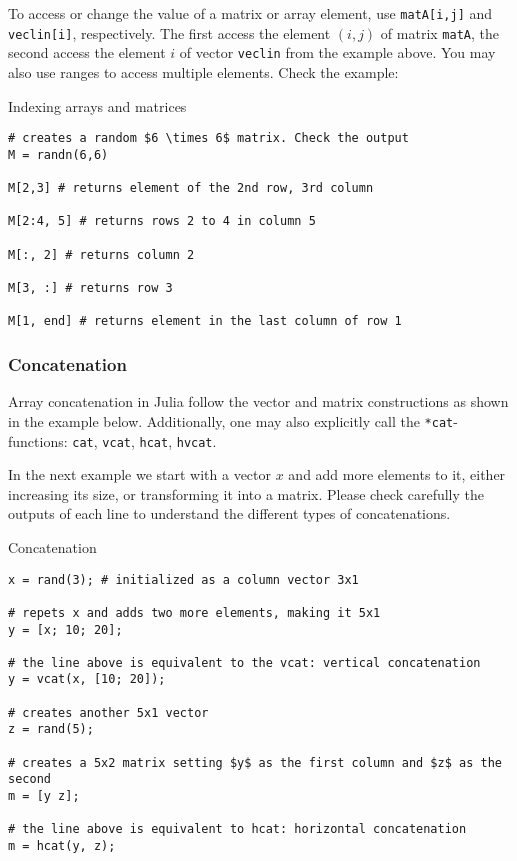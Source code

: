To access or change the value of a matrix or array element, use \texttt{matA[i,j]} and \texttt{veclin[i]}, respectively. The first access the element $(i,j)$ of matrix \texttt{matA}, the second access the element $i$ of vector \texttt{veclin} from the example above. You may also use ranges to access multiple elements. Check the example:

\begin{example}{Indexing arrays and matrices}
\begin{verbatim}
# creates a random $6 \times 6$ matrix. Check the output
M = randn(6,6)

M[2,3] # returns element of the 2nd row, 3rd column

M[2:4, 5] # returns rows 2 to 4 in column 5

M[:, 2] # returns column 2

M[3, :] # returns row 3

M[1, end] # returns element in the last column of row 1
\end{verbatim}
\end{example}

\subsubsection{Concatenation}

Array concatenation in Julia follow the vector and matrix constructions as shown in the example below. Additionally, one may also explicitly call the \texttt{*cat}-functions: \texttt{cat}, \texttt{vcat}, \texttt{hcat}, \texttt{hvcat}.

In the next example we start with a vector $x$ and add more elements to it, either increasing its size, or transforming it into a matrix. Please check carefully the outputs of each line to understand the different types of concatenations.

\begin{example}{Concatenation}
\label{ex:concatenation}
\begin{verbatim}
x = rand(3); # initialized as a column vector 3x1

# repets x and adds two more elements, making it 5x1
y = [x; 10; 20];

# the line above is equivalent to the vcat: vertical concatenation
y = vcat(x, [10; 20]);

# creates another 5x1 vector
z = rand(5); 

# creates a 5x2 matrix setting $y$ as the first column and $z$ as the second
m = [y z]; 

# the line above is equivalent to hcat: horizontal concatenation
m = hcat(y, z);
\end{verbatim}
\end{example}

